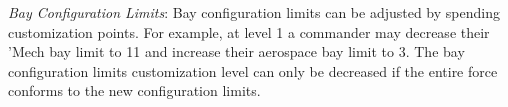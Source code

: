 \emph{Bay Configuration Limits}: Bay configuration limits can be adjusted by spending customization points.
For example, at level 1 a commander may decrease their 'Mech bay limit to 11 and increase their aerospace bay limit to 3.
The bay configuration limits customization level can only be decreased if the entire force conforms to the new configuration limits.
